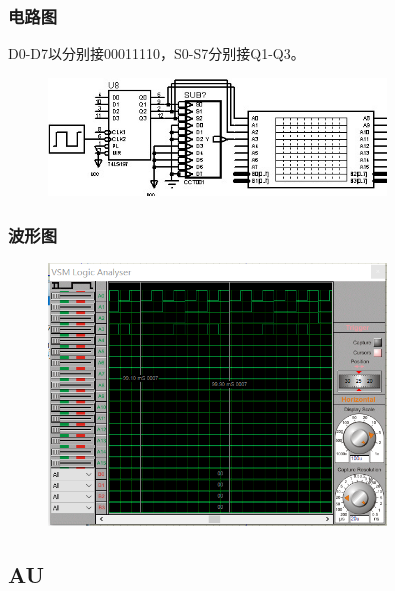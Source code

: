 \documentclass[UTF8, a4paper, 11pt]{article}
\begin{document}
\subsubsection{电路图}
D0-D7以分别接00011110，S0-S7分别接Q1-Q3。
\begin{figure}[H]
    \centering
    \includegraphics[width=0.8\textwidth]{ex6.1电路图1.jpg}
\end{figure}
\subsubsection{波形图}
\begin{figure}[H]
    \centering
    \includegraphics[width=0.8\textwidth]{ex6.1波形图.png}
\end{figure}
\subsection{AU}
\end{document}
